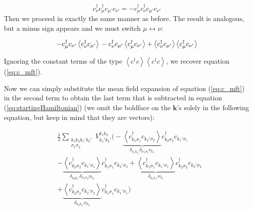 \begin{equation}
c_\nu^\dagger c_\mu^\dagger c_{\mu'} c_{\nu'} = - c_\mu^\dagger c_\nu^\dagger c_{\mu'} c_{\nu'}
\end{equation}
Then we proceed in exactly the same manner as before. The result is analogous, but a minus sign appears and we must switch $\mu \leftrightarrow \nu$:

\begin{equation}
- c_\mu^\dagger c_{\nu'} \left\langle c_\nu^\dagger c_{\mu'} \right\rangle \\
- c_\nu^\dagger c_{\mu'} \left\langle c_\mu^\dagger c_{\nu'} \right\rangle + \left\langle c_\nu^\dagger c_{\mu'} \right\rangle \left\langle c_\mu^\dagger c_{\nu'} \right\rangle
\end{equation}

Ignoring the constant terms of the type $\left\langle c^\dagger c \right\rangle \left\langle c^\dagger c \right\rangle$, we recover equation (\ref{eq:c_mft}).

Now we can simply substitute the mean field expansion of equation (\ref{eq:c_mft}) in the second term to  obtain the last term that is subtracted in equation (\ref{eq:startingHamiltonian}) (we omit the boldface on the $\bm k$'s solely in the following equation, but keep in mind that they are vectors):

\begin{equation}\label{eq:mean_field}
\begin{split}
&\frac{1}{2} \sum_{\substack{ k_1 k_2 k_1' k_2' \\ \sigma_1 \sigma_2} } V^{k_1 k_2}_{k_1' k_2'} \bigg( - \underbrace{\left\langle c_{k_1 \sigma_1}^\dagger c_{k_2' \sigma_2} \right\rangle}_{\delta_{k_1 k_2'} \delta_{\sigma_1 \sigma_2} \nu_{k_1} } c_{k_2 \sigma_2}^\dagger c_{k_1' \sigma_1} \\
& - \underbrace{\left\langle c_{k_2 \sigma_2}^\dagger c_{k_1' \sigma_1}  \right\rangle}_{\delta_{k_2 k_1'} \delta_{\sigma_1 \sigma_2} \nu_{k_2} } c_{k_1 \sigma_1}^\dagger c_{k_2' \sigma_2} + \underbrace{\left\langle c_{k_1 \sigma_1}^\dagger c_{k_1' \sigma_1} \right\rangle}_{\delta_{k_1 k_1'} \nu_{k_1} } c_{k_2 \sigma_2}^\dagger c_{k_2' \sigma_2}  \\
& + \underbrace{\left\langle c_{k_2 \sigma_2}^\dagger c_{k_2' \sigma_2} \right\rangle}_{\delta_{k_2 k_2'} \nu_{k_2} } c_{k_1 \sigma_1}^\dagger c_{k_1' \sigma_1} \bigg)\\
\end{split}
\end{equation}

